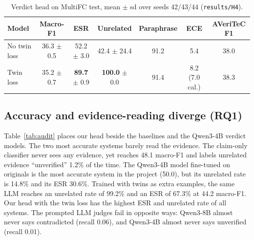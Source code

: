 \begin{table}[t]
\centering\small
\caption{Verdict head on MultiFC test, mean $\pm$ sd over seeds 42/43/44 (\texttt{results/H4}).}
\label{tab:twinloss}
\begin{tabular}{@{}lcccccc@{}}
\toprule
Model & Macro-F1 & ESR & Unrelated & Paraphrase & ECE & AVeriTeC F1 \\
\midrule
No twin loss & 36.3 $\pm$ 0.5 & 52.2 $\pm$ 3.0 & 42.4 $\pm$ 24.4 & 91.2 & 5.4 & 38.0 \\
Twin loss & 35.2 $\pm$ 0.7 & \textbf{89.7} $\pm$ 0.9 & \textbf{100.0} $\pm$ 0.0 & 91.4 & 8.2 (7.0 cal.) & 38.3 \\
\bottomrule
\end{tabular}
\end{table}

\subsection{Accuracy and evidence-reading diverge (RQ1)}
Table~\ref{tab:audit} places our head beside the baselines and the Qwen3-4B verdict models. The two most accurate systems barely read the evidence. The claim-only classifier never sees any evidence, yet reaches 48.1 macro-F1 and labels unrelated evidence ``unverified'' 1.2\% of the time. The Qwen3-4B model fine-tuned on originals is the most accurate system in the project (50.0), but its unrelated rate is 14.8\% and its ESR 30.6\%. Trained with twins as extra examples, the same LLM reaches an unrelated rate of 99.2\% and an ESR of 67.3\% at 44.2 macro-F1. Our head with the twin loss has the highest ESR and unrelated rate of all systems. The prompted LLM judges fail in opposite ways: Qwen3-8B almost never says contradicted (recall 0.06), and Qwen3-4B almost never says unverified (recall 0.01).

